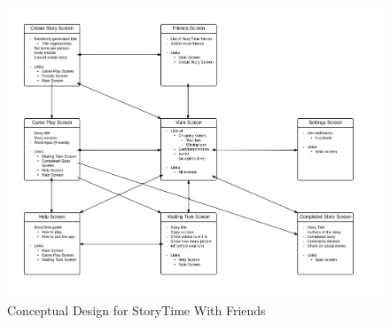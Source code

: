 \documentclass{sigchi}
\begin{document}
\begin{figure}[h!]
\centering
\includegraphics[width=\linewidth]{image00.png}
\caption{Conceptual Design for StoryTime With Friends}
\label{fig:conceptual}
\end{figure}





\onecolumn
{}\label{apx:roles}
\end{document}
